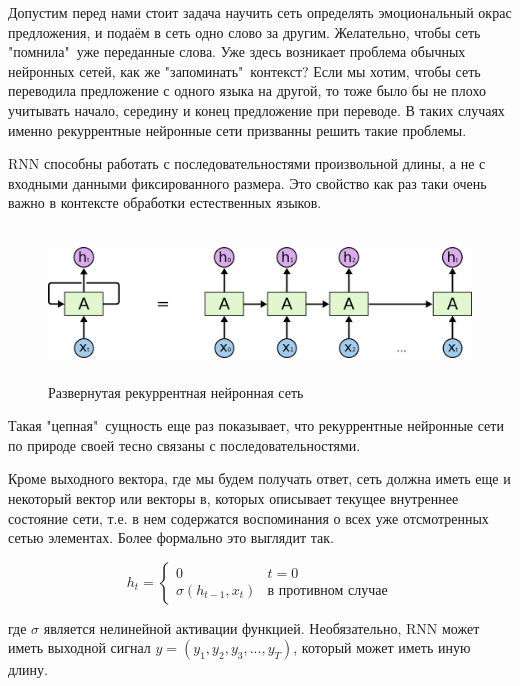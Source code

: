 \documentclass[a4paper,12pt]{article}
\begin{document}
	Допустим перед нами стоит задача научить сеть определять эмоциональный окрас предложения, и подаём в сеть одно слово за другим. Желательно, чтобы сеть "помнила"\ уже переданные слова. Уже здесь возникает проблема обычных нейронных сетей, как же "запоминать"\ контекст? Если мы хотим, чтобы сеть переводила предложение с одного языка на другой, то тоже было бы не плохо учитывать начало, середину и конец предложение при переводе. В таких случаях именно рекуррентные нейронные сети призванны решить такие проблемы.

	RNN способны работать с последовательностями произвольной длины, а не с входными данными фиксированного размера. Это свойство как раз таки очень важно в контексте обработки естественных языков. 

	\begin{figure}[ht!]
		\centering
		\captionsetup{justification=centering}
		\includegraphics[height=40mm]{img/3.png}
		\caption{Развернутая рекуррентная нейронная сеть}
	\end{figure}
	
	Такая "цепная"\ сущность еще раз показывает, что рекуррентные нейронные сети по природе своей тесно связаны с последовательностями. 
	
	Кроме выходного вектора, где мы будем получать ответ, сеть должна иметь еще и некоторый вектор или векторы в, которых описывает текущее внутреннее состояние сети, т.е. в нем содержатся воспоминания о всех уже отсмотренных сетью элементах. Более формально это выглядит так.
	
	\begin{equation}
		h_t = 
		\begin{cases}
			0 & t = 0 \\
			\sigma(h_{t - 1}, x_t) & \text{в противном случае}
		\end{cases}
	\end{equation}

	где $\sigma$ является нелинейной активации функцией. Необязательно, RNN может иметь выходной сигнал $y = (y_1, y_2, y_3, ... , y_T)$, который может иметь иную длину.
	
\end{document}
